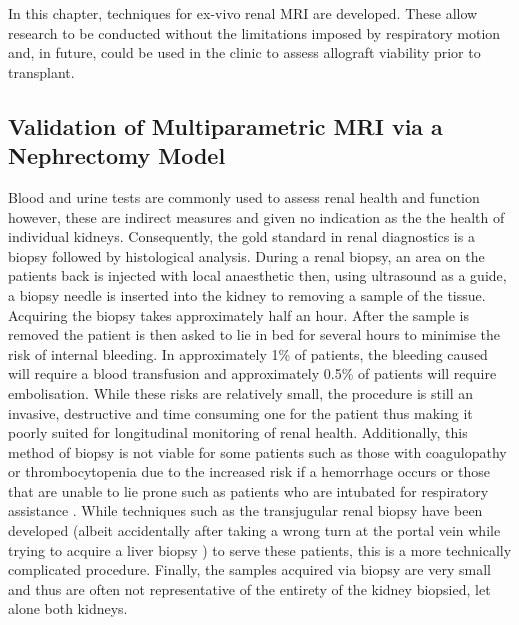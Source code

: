 In this chapter, techniques for ex-vivo renal \ac{MRI} are developed. These allow research to be conducted without the limitations imposed by respiratory motion and, in future, could be used in the clinic to assess allograft viability prior to transplant.

\subsection{Validation of Multiparametric MRI via a Nephrectomy Model}

Blood and urine tests are commonly used to assess renal health and function however, these are indirect measures and given no indication as the the health of individual kidneys. Consequently, the gold standard in renal diagnostics is a biopsy followed by histological analysis. During a renal biopsy, an area on the patients back is injected with local anaesthetic then, using ultrasound as a guide, a biopsy needle is inserted into the kidney to removing a sample of the tissue. Acquiring the biopsy takes approximately half an hour. After the sample is removed the patient is then asked to lie in bed for several hours to minimise the risk of internal bleeding. In approximately 1\% of patients, the bleeding caused will require a blood transfusion and approximately 0.5\% of patients will require embolisation. While these risks are relatively small, the procedure is still an invasive, destructive and time consuming one for the patient thus making it poorly suited for longitudinal monitoring of renal health. Additionally, this method of biopsy is not viable for some patients such as those with coagulopathy or thrombocytopenia due to the increased risk if a hemorrhage occurs or those that are unable to lie prone such as patients who are intubated for respiratory assistance \cite{rathod_safety_2017}. While techniques such as the transjugular renal biopsy have been developed (albeit accidentally after taking a wrong turn at the portal vein while trying to acquire a liver biopsy \cite{mal_transjugular_1990}) to serve these patients, this is a more technically complicated procedure. Finally, the samples acquired via biopsy are very small and thus are often not representative of the entirety of the kidney biopsied, let alone both kidneys.

